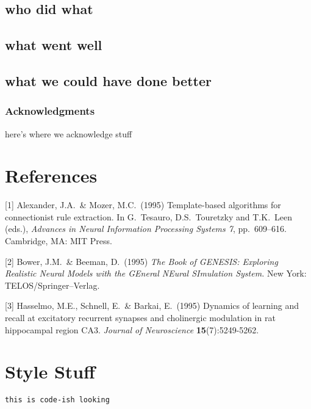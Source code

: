 \documentclass{article}
\begin{document}
\subsection{who did what}
\subsection{what went well}
\subsection{what we could have done better}

\subsubsection*{Acknowledgments}

here's where we acknowledge stuff

\section*{References}

\medskip

\small

[1] Alexander, J.A.\ \& Mozer, M.C.\ (1995) Template-based algorithms
for connectionist rule extraction. In G.\ Tesauro, D.S.\ Touretzky and
T.K.\ Leen (eds.), {\it Advances in Neural Information Processing
  Systems 7}, pp.\ 609--616. Cambridge, MA: MIT Press.

[2] Bower, J.M.\ \& Beeman, D.\ (1995) {\it The Book of GENESIS:
  Exploring Realistic Neural Models with the GEneral NEural SImulation
  System.}  New York: TELOS/Springer--Verlag.

[3] Hasselmo, M.E., Schnell, E.\ \& Barkai, E.\ (1995) Dynamics of
learning and recall at excitatory recurrent synapses and cholinergic
modulation in rat hippocampal region CA3. {\it Journal of
  Neuroscience} {\bf 15}(7):5249-5262.

\section{Style Stuff}
\verb+this is code-ish looking+ 
\end{document}
